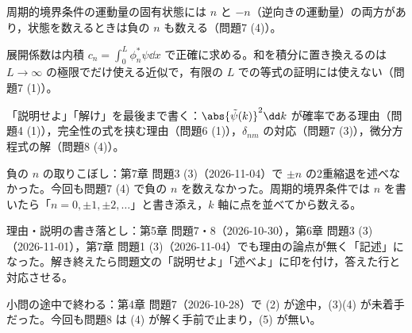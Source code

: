 \documentclass[uplatex,dvipdfmx,a4paper,11pt]{jsarticle}
\begin{document}
\matome
\begin{saitenichiran}
\end{saitenichiran}
\begin{daiji}
  \item 周期的境界条件の運動量の固有状態には $n$ と $-n$（逆向きの運動量）の両方があり，状態を数えるときは負の $n$ も数える（問題7 (4)）。
  \item 展開係数は内積 $c_{n}=\int_{0}^{L}\phi_{n}^{*}\psi\dd x$ で正確に求める。和を積分に置き換えるのは $L\to\infty$ の極限でだけ使える近似で，有限の $L$ での等式の証明には使えない（問題7 (1)）。
  \item 「説明せよ」「解け」を最後まで書く：$\abs{\tilde{\psi}(k)}^{2}\dd k$ が確率である理由（問題4 (1)），完全性の式を挟む理由（問題6 (1)），$\delta_{nm}$ の対応（問題7 (3)），微分方程式の解（問題8 (4)）。
\end{daiji}
\begin{maemo}
  \item 負の $n$ の取りこぼし：第7章 問題3 (3)（2026-11-04）で $\pm n$ の2重縮退を述べなかった。今回も問題7 (4) で負の $n$ を数えなかった。周期的境界条件では $n$ を書いたら「$n=0,\pm1,\pm2,\ldots$」と書き添え，$k$ 軸に点を並べてから数える。
  \item 理由・説明の書き落とし：第5章 問題7・8（2026-10-30），第6章 問題3 (3)（2026-11-01），第7章 問題1 (3)（2026-11-04）でも理由の論点が無く「記述」になった。解き終えたら問題文の「説明せよ」「述べよ」に印を付け，答えた行と対応させる。
  \item 小問の途中で終わる：第4章 問題7（2026-10-28）で (2) が途中，(3)(4) が未着手だった。今回も問題8 は (4) が解く手前で止まり，(5) が無い。
\end{maemo}
\end{document}
